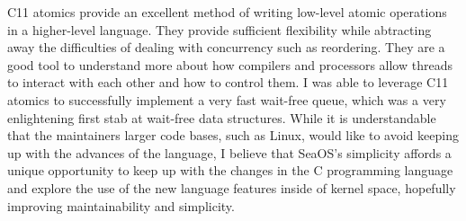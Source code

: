 \documentclass[12pt]{article}
\begin{document}
\vspace{10mm}

C11 atomics provide an excellent method of writing low-level atomic operations in
a higher-level language. They provide sufficient flexibility while abtracting
away the difficulties of dealing with concurrency such as reordering.
They are a good tool to understand more about how compilers
and processors allow threads to interact with each other and how to control them.
I was able to leverage C11 atomics to successfully implement a very fast wait-free
queue, which was a very enlightening first stab at wait-free data structures.
While it is understandable that the maintainers larger code bases, such as Linux,
would like to avoid keeping up with the advances of the language, I believe
that SeaOS's simplicity affords a unique opportunity to keep up with the changes
in the C programming language and explore the use of the new language features inside
of kernel space, hopefully improving maintainability and simplicity.


\clearpage

{}

\end{document}
